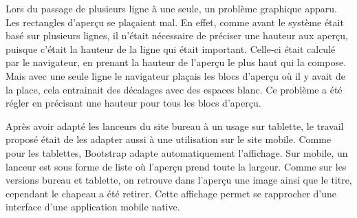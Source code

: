 \documentclass[12pt,a4paper]{article}
\begin{document}
Lors du passage de plusieurs ligne à une seule, un problème graphique apparu. Les rectangles d'aperçu se plaçaient mal. En effet, comme avant le système était basé sur plusieurs lignes, il n'était nécessaire de préciser une hauteur aux aperçu, puisque c'était la hauteur de la ligne qui était important. Celle-ci était calculé par le navigateur, en prenant la hauteur de l'aperçu le plus haut qui la compose. Mais avec une seule ligne le navigateur plaçais les blocs d'aperçu où il y avait de la place, cela entrainait des décalages avec des espaces blanc. Ce problème a été régler en précisant une hauteur pour tous les blocs d'aperçu.\par 
\bigskip
Après avoir adapté les lanceurs du site bureau à un usage sur tablette, le travail proposé était de les adapter aussi à une utilisation sur le site mobile. Comme pour les tablettes, Bootstrap adapte automatiquement l'affichage. Sur mobile, un lanceur est sous forme de liste où l'aperçu prend toute la largeur. Comme sur les versions bureau et tablette, on retrouve dans l'aperçu une image ainsi que le titre, cependant le chapeau a été retirer. Cette affichage permet se rapprocher d'une interface d'une application mobile native.\par
\end{document}
